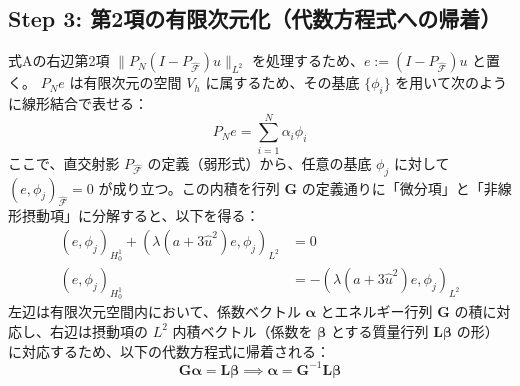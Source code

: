 \documentclass[a4paper, 11pt]{ltjsreport}
\theoremstyle{plain}
\theoremstyle{definition}
\begin{document}
\subsection*{Step 3: 第2項の有限次元化（代数方程式への帰着）}
式Aの右辺第2項 $\|P_N(I - P_{\hat{\mathcal{F}}})u\|_{L^2}$ を処理するため、$e := (I - P_{\hat{\mathcal{F}}})u$ と置く。
$P_N e$ は有限次元の空間 $V_h$ に属するため、その基底 $\{\phi_i\}$ を用いて次のように線形結合で表せる：
\begin{equation}
P_N e = \sum_{i=1}^N \alpha_i \phi_i
\end{equation}
ここで、直交射影 $P_{\hat{\mathcal{F}}}$ の定義（弱形式）から、任意の基底 $\phi_j$ に対して $(e, \phi_j)_{\hat{\mathcal{F}}} = 0$ が成り立つ。この内積を行列 $\mathbf{G}$ の定義通りに「微分項」と「非線形摂動項」に分解すると、以下を得る：
\begin{align}
(e, \phi_j)_{H_0^1} + (\lambda(a + 3\hat{u}^2)e, \phi_j)_{L^2} &= 0 \\
(e, \phi_j)_{H_0^1} &= -(\lambda(a + 3\hat{u}^2)e, \phi_j)_{L^2}
\end{align}
左辺は有限次元空間内において、係数ベクトル $\mathbf{\alpha}$ とエネルギー行列 $\mathbf{G}$ の積に対応し、右辺は摂動項の $L^2$ 内積ベクトル（係数を $\mathbf{\beta}$ とする質量行列 $\mathbf{L}\mathbf{\beta}$ の形）に対応するため、以下の代数方程式に帰着される：
\begin{equation}
\mathbf{G} \mathbf{\alpha} = \mathbf{L} \mathbf{\beta} \implies \mathbf{\alpha} = \mathbf{G}^{-1} \mathbf{L} \mathbf{\beta}
\end{equation}
\end{document}
